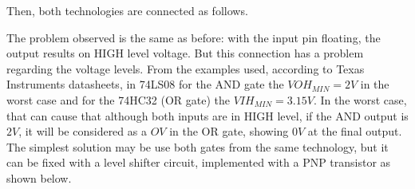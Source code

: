 Then, both technologies are connected as follows.


The problem observed is the same as before: with the input pin floating, the output results on HIGH
level voltage. But this connection has a problem regarding the voltage levels. From the examples used, 
according to Texas Instruments datasheets, 
in 74LS08 for the AND gate the $VOH_{MIN}=2V$ in the worst case and for the 74HC32 (OR gate) the $VIH_{MIN}=3.15V$.
In the worst case, that can cause that although both inputs are in HIGH level, if the AND output is $2V$, 
it will be considered as a $OV$ in the OR gate, showing $0V$ at the final output.
The simplest solution may be use both gates from the same technology, but it can be fixed with a 
level shifter circuit, implemented with a PNP transistor as shown below.

